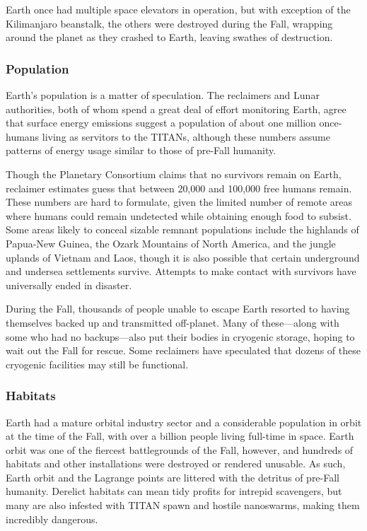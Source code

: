 Earth once had multiple space elevators in operation, but with exception of the Kilimanjaro beanstalk, 
the others were destroyed during the Fall, wrapping 
around the planet as they crashed to Earth, leaving 
swathes of destruction.

\subsubsection{Population}

Earth's population is a matter of speculation. The 
reclaimers and Lunar authorities, both of whom 
spend a great deal of effort monitoring Earth, agree 
that surface energy emissions suggest a population of 
about one million once-humans living as servitors to 
the TITANs, although these numbers assume patterns 
of energy usage similar to those of pre-Fall humanity.

Though the Planetary Consortium claims that 
no survivors remain on Earth, reclaimer estimates 
guess that between 20,000 and 100,000 free humans 
remain. These numbers are hard to formulate, given 
the limited number of remote areas where humans 
could remain undetected while obtaining enough food 
to subsist. Some areas likely to conceal sizable remnant populations include the highlands of Papua-New 
Guinea, the Ozark Mountains of North America, and 
the jungle uplands of Vietnam and Laos, though it is 
also possible that certain underground and undersea 
settlements survive. Attempts to make contact with 
survivors have universally ended in disaster.

During the Fall, thousands of people unable to 
escape Earth resorted to having themselves backed 
up and transmitted off-planet. Many of these—along 
with some who had no backups—also put their bodies 
in cryogenic storage, hoping to wait out the Fall for 
rescue. Some reclaimers have speculated that dozens 
of these cryogenic facilities may still be functional.

\subsubsection{Habitats}

Earth had a mature orbital industry sector and a considerable population in orbit at the time of the Fall, 
with over a billion people living full-time in space. 
Earth orbit was one of the fiercest battlegrounds of 
the Fall, however, and hundreds of habitats and other 
installations were destroyed or rendered unusable. As 
such, Earth orbit and the Lagrange points are littered 
with the detritus of pre-Fall humanity. Derelict habitats can mean tidy profits for intrepid scavengers, but 
many are also infested with TITAN spawn and hostile 
nanoswarms, making them incredibly dangerous.


